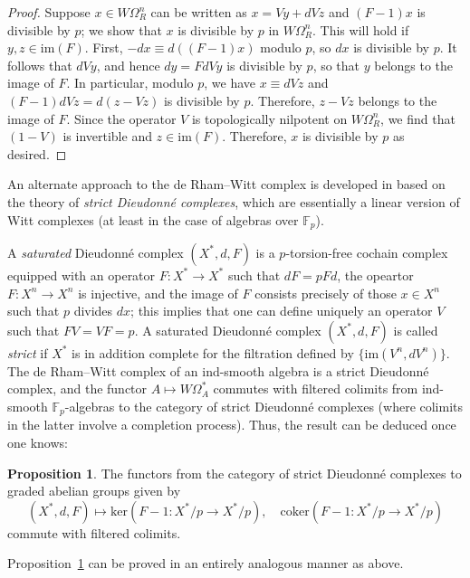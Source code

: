 \documentclass{amsart}
\theoremstyle{definition}
\newtheorem{proposition}[definition]{Proposition}
\begin{document}
\begin{proof}
Suppose $x \in W \Omega^n_R$
can be written as $x = Vy + dVz$ and $(F -1 )x $ is divisible by $p$; we show
that $x $ is divisible by $p$ in $ W \Omega^n_R$. This will hold if $y, z \in
\mathrm{im}(F)$. 
First, $-dx \equiv d((F-1) x)$ modulo $p$, so $dx$ is divisible by $p$. 
It follows that 
$d Vy$, and hence $dy = FdVy$ is divisible by $p$, so that $y$ belongs to the
image of $F$. In particular, modulo $p$, we have $x \equiv dV z$ and 
$(F-1) d Vz  = d (z - Vz)$ is divisible by $p$. 
Therefore, $z - Vz$ belongs to the image of $F$. Since the operator $V$ is
topologically nilpotent on $W \Omega^n_R$, we find that $(1 - V)$ is invertible
and $z \in \mathrm{im}(F)$. 
Therefore, $x$ is divisible by $p$ as desired. 
\end{proof}



An alternate approach to the 
de Rham--Witt complex is developed in \cite{BLM} based on the theory of
\emph{strict Dieudonn\'e complexes}, which are essentially a linear version
of Witt complexes (at least in the case of algebras over $\mathbb{F}_p$). 

A \emph{saturated} Dieudonn\'e complex 
$(X^{\ast}, d, F)$ is a  $p$-torsion-free cochain complex
equipped with an operator $F: X^{\ast} \to X^{\ast}$ such that $dF = pFd$, the
opeartor $F: X^n \to X^n$ is injective, and the image of $F$ consists
precisely of those $x \in X^n$ such that $p $ divides $dx$; this implies that one
can define uniquely an operator $V$ such that $FV = VF = p$.  
A saturated Dieudonn\'e complex $(X^{\ast}, d, F)$ is called \emph{strict} if 
$X^{\ast}$ is in addition complete for the filtration defined by
$\{\mathrm{im}(V^n, d V^n)\}$. The de Rham--Witt complex of an ind-smooth
algebra is a strict Dieudonn\'e complex, and the functor $A \mapsto W
\Omega_A^{\ast}$ commutes with filtered colimits from ind-smooth
$\mathbb{F}_p$-algebras to the category of strict Dieudonn\'e complexes (where
colimits in the latter involve a completion process). 
Thus, the result can
be deduced once one knows: 

\begin{proposition} 
\label{strictDieudonne}
The functors
from the category of strict Dieudonn\'e complexes to graded abelian groups
given by 
$$(X^{\ast}, d, F)\mapsto \mathrm{ker}(F-1: X^{\ast}/p \to X^{\ast}/p), \quad 
\mathrm{coker}( F-1 : X^{\ast}/p \to X^{\ast}/p)
$$
commute with filtered colimits. \end{proposition} 
Proposition~\ref{strictDieudonne} can be proved in an entirely analogous manner
as above. 
\end{document}
